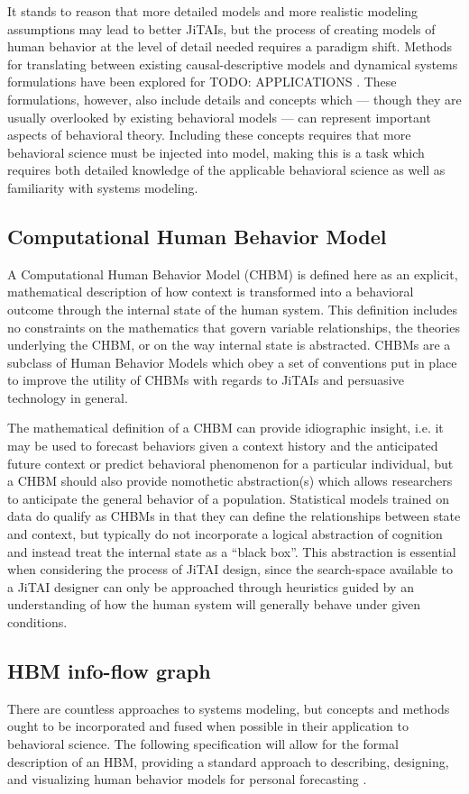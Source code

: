 \documentclass[runningheads,a4paper]{llncs}
\begin{document}
It stands to reason that more detailed models and more realistic modeling assumptions may lead to better JiTAIs, but the process of creating models of human behavior at the level of detail needed requires a paradigm shift.
Methods for translating between existing causal-descriptive models and dynamical systems formulations have been explored for TODO: APPLICATIONS \cite{csel?}. 
These formulations, however, also include details and concepts which --- though they are usually overlooked by existing behavioral models --- can represent important aspects of behavioral theory.
Including these concepts requires that more behavioral science must be injected into model, making this is a task which requires both detailed knowledge of the applicable behavioral science as well as familiarity with systems modeling.
\subsection{Computational Human Behavior Model}
A Computational Human Behavior Model (CHBM) is defined here as an explicit, mathematical description of how context is transformed into a behavioral outcome through the internal state of the human system.
This definition includes no constraints on the mathematics that govern variable relationships, the theories underlying the CHBM, or on the way internal state is abstracted.
CHBMs are a subclass of Human Behavior Models which obey a set of conventions put in place to improve the utility of CHBMs with regards to JiTAIs and persuasive technology in general.

The mathematical definition of a CHBM can provide idiographic insight, i.e. it may be used to forecast behaviors given a context history and the anticipated future context or predict behavioral phenomenon for a particular individual, but a CHBM should also provide nomothetic abstraction(s) which allows researchers to anticipate the general behavior of a population.
Statistical models trained on data do qualify as CHBMs in that they can define the relationships between state and context, but typically do not incorporate a logical abstraction of cognition and instead treat the internal state as a “black box”.
This abstraction is essential when considering the process of JiTAI design, since the search-space available to a JiTAI designer can only be approached through heuristics guided by an understanding of how the human system will generally behave under given conditions.

\subsection{HBM info-flow graph}
There are countless approaches to systems modeling, but concepts and methods ought to be incorporated and fused when possible in their application to behavioral science.
The following specification will allow for the formal description of an HBM, providing a standard approach to describing, designing, and visualizing human behavior models for personal forecasting .
\end{document}
